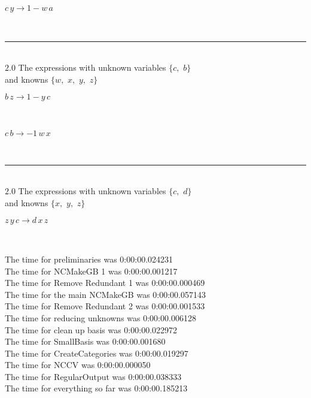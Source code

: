\documentclass[rep10,leqno]{report}
\begin{document}
\begin{minipage}{6in}
$
c\,
 y\rightarrow 1 - w\,
 a
$
\end{minipage}\\
\rule[3pt]{6in}{.7pt}\\
$2.0$  The expressions with unknown variables $\{c,
$ $
b\}$\\
and knowns $\{w,
$ $
x,
$ $
y,
$ $
z\}$\smallskip\\
\begin{minipage}{6in}
$
b\,
 z\rightarrow 1 - y\,
 c
$
\end{minipage}\medskip \\
\begin{minipage}{6in}
$
c\,
 b\rightarrow -1\,
 w\,
 x
$
\end{minipage}\\
\rule[3pt]{6in}{.7pt}\\
$2.0$  The expressions with unknown variables $\{c,
$ $
d\}$\\
and knowns $\{x,
$ $
y,
$ $
z\}$\smallskip\\
\begin{minipage}{6in}
$
z\,
 y\,
 c\rightarrow d\,
 x\,
 z
$
\end{minipage}\\
\vspace{10pt}

\noindent
The time for preliminaries was 0:00:00.024231\\
The time for NCMakeGB 1 was 0:00:00.001217\\
The time for Remove Redundant 1 was 0:00:00.000469\\
The time for the main NCMakeGB was 0:00:00.057143\\
The time for Remove Redundant 2 was 0:00:00.001533\\
The time for reducing unknowns was 0:00:00.006128\\
The time for clean up basis was 0:00:00.022972\\
The time for SmallBasis was 0:00:00.001680\\
The time for CreateCategories was 0:00:00.019297\\
The time for NCCV was 0:00:00.000050\\
The time for RegularOutput was 0:00:00.038333\\
The time for everything so far was 0:00:00.185213\\
\end{document}
